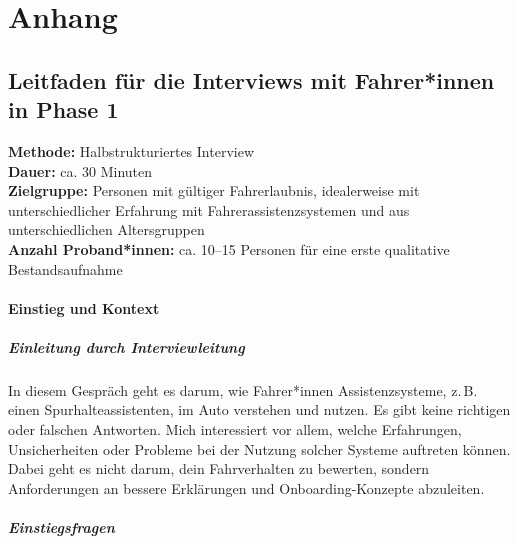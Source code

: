 
\chapter{Anhang}
\label{chap:appendix}


\section{Leitfaden für die Interviews mit Fahrer*innen in Phase 1}
\label{sec:interviewleitfaden}

\noindent
\textbf{Methode:} Halbstrukturiertes Interview\\
\textbf{Dauer:} ca. 30 Minuten\\
\textbf{Zielgruppe:} Personen mit gültiger Fahrerlaubnis, idealerweise
mit unterschiedlicher Erfahrung mit Fahrerassistenzsystemen und aus
unterschiedlichen Altersgruppen\\
\textbf{Anzahl Proband*innen:} ca. 10--15 Personen für eine erste
qualitative Bestandsaufnahme


\subsubsection{Einstieg und Kontext}

\paragraph*{Einleitung durch Interviewleitung}

In diesem Gespräch geht es darum, wie Fahrer*innen Assistenzsysteme,
z.\,B. einen Spurhalteassistenten, im Auto verstehen und nutzen.
Es gibt keine richtigen oder falschen Antworten. Mich interessiert
vor allem, welche Erfahrungen, Unsicherheiten oder Probleme bei der
Nutzung solcher Systeme auftreten können. Dabei geht es nicht darum,
dein Fahrverhalten zu bewerten, sondern Anforderungen an bessere
Erklärungen und Onboarding-Konzepte abzuleiten.

\paragraph*{Einstiegsfragen}

